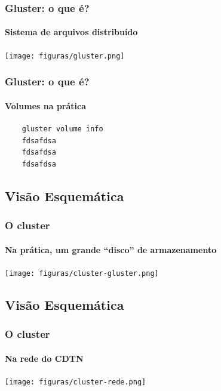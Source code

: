 \documentclass[svgnames,smaller,table]{beamer}
\begin{document}
\begin{frame}
  \frametitle{Gluster: o que é?}
  \framesubtitle{Sistema de arquivos distribuído}
    \begin{center}
      \texttt{[image: figuras/gluster.png]}
    \end{center}
\end{frame}

\begin{frame}[fragile]
  \frametitle{Gluster: o que é?}
  \framesubtitle{Volumes na prática}
  \begin{lstlisting}
    gluster volume info
    fdsafdsa
    fdsafdsa
    fdsafdsa
  \end{lstlisting}
\end{frame}

\subsection{Visão Esquemática}
\begin{frame}[noframenumbering]
  \frametitle{O cluster}
  \framesubtitle{Na prática, um grande ``disco'' de armazenamento}
    \begin{center}
      \texttt{[image: figuras/cluster-gluster.png]}
        \end{center}
\end{frame}

\subsection{Visão Esquemática}
\begin{frame}
  \frametitle{O cluster}
  \framesubtitle{Na rede do CDTN}
  \begin{center}
    \texttt{[image: figuras/cluster-rede.png]}
  \end{center}
  
\end{frame}
\end{document}
